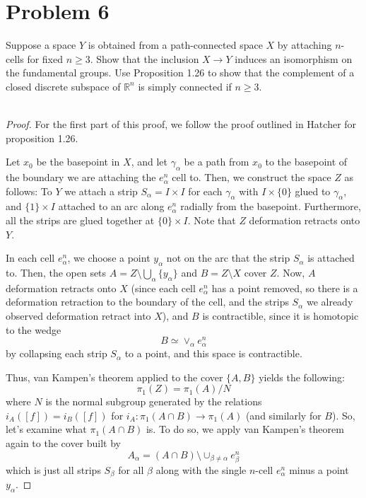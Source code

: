 \documentclass[fontsize=11pt]{scrartcl} %
\numberwithin{equation}{section} %
\numberwithin{figure}{section} %
\numberwithin{table}{section} %
\newcommand{\R}{\mathbb{R}}
\begin{document}
\newpage
\section*{Problem 6}
Suppose a space $Y$ is obtained from a path-connected space $X$ by attaching
$n$-cells for fixed $n\geq 3$. Show that the inclusion $X\to Y$ induces an
isomorphism on the fundamental groups.
Use Proposition 1.26 to show that the complement of a closed discrete subspace
of $\R^n$ is simply connected if $n\geq 3$.
\\
\\
\begin{proof}
    For the first part of this proof, we follow the proof outlined in Hatcher
    for proposition 1.26.

    Let $x_0$ be the basepoint in $X$, and let $\gamma_{\alpha}$ be a path from
    $x_0$ to the basepoint of the boundary we are attaching the $e_{\alpha}^n$
    cell to. Then, we construct the space $Z$ as follows: To $Y$ we attach a
    strip $S_{\alpha} = I\times I$ for each $\gamma_{\alpha}$ with $I\times \{0\}$ glued to
    $\gamma_{\alpha}$, and $\{1\}\times I$ attached to an arc along
    $e_{\alpha}^n$ radially from the basepoint. Furthermore, all the strips are
    glued together at $\{0\}\times I$. Note that $Z$ deformation retracts onto
    $Y$.

    In each cell $e_{\alpha}^n$, we choose a point $y_{\alpha}$ not on the arc
    that the strip $S_{\alpha}$ is attached to. Then, the open sets $A =
    Z\setminus \bigcup_{\alpha}\{y_{\alpha}\}$ and $B = Z\setminus X$ cover $Z$.
    Now, $A$ deformation retracts onto $X$ (since each cell $e_{\alpha}^n$ has a
        point removed, so there is a deformation retraction to the boundary of
        the cell, and the strips $S_{\alpha}$ we already observed deformation
    retract into $X$), and $B$ is contractible, since it is homotopic to the
    wedge
    \[
        B\simeq \vee_{\alpha}e_{\alpha}^n
    \]
    by collapsing each strip $S_{\alpha}$ to a point, and this space is
    contractible.

    Thus, van Kampen's theorem applied to the cover $\{A,B\}$ yields the
    following:
    \[
        \pi_1(Z) = \pi_1(A)/N
    \]
    where $N$ is the normal subgroup generated by the relations $i_A([f]) =
    i_B([f])$ for $i_A:\pi_1(A\cap B)\to\pi_1(A)$ (and similarly for $B$).  So,
    let's examine what $\pi_1(A\cap B)$ is. To do so, we apply van Kampen's
    theorem again to the cover built by
    \[
        A_{\alpha} = (A\cap B)\setminus \cup_{\beta\neq \alpha}e_{\beta}^n
    \]
    which is just all strips $S_{\beta}$ for all $\beta$ along with the single
    $n$-cell $e^n_{\alpha}$ minus a point $y_{\alpha}$.
    

\end{proof}
\end{document}
